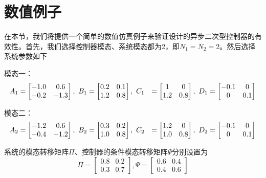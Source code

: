 \section{数值例子}
	在本节，我们将提供一个简单的数值仿真例子来验证设计的异步二次型控制器的有效性。首先，我们选择控制器模态、系统模态都为2，即$N_1=N_2=2$。然后选择系统参数如下
	
	模态一：
	\begin{equation} \notag
	\begin{aligned}
	A_{1} &= \begin{bmatrix}
	-1.0&0.6\\
	-0.2&-1.3
	\end{bmatrix}, \ 
	B_{1} = \begin{bmatrix}
	0.2&0.1\\ 1.2&0.8
	\end{bmatrix} ,\
		C_{1} &= \begin{bmatrix}
	1&0\\1.2&0.8
	\end{bmatrix},\
	D_{1} = \begin{bmatrix}
	-0.1&0\\0&0.1
	\end{bmatrix}
	\end{aligned}  
	\end{equation}
	
	模态二：
	\begin{equation} \notag
	\begin{aligned}
	A_{2} &= \begin{bmatrix}
	-1.2&0.6\\
	-0.4&-1.2
	\end{bmatrix}, \ 
	B_{2} = \begin{bmatrix}
	0.3&0.2\\ 1.0&0.8
	\end{bmatrix} ,\
	C_{2} &= \begin{bmatrix}
	1.2&0\\1.0&0.8
	\end{bmatrix},\
	D_{2} = \begin{bmatrix}
	-0.1&0\\0&0.1
	\end{bmatrix}
	\end{aligned}  
	\end{equation}
	
	系统的模态转移矩阵$\varPi$、控制器的条件模态转移矩阵$\varPsi$分别设置为
	\begin{equation}
		\varPi = \begin{bmatrix}
		0.8& 0.2\\ 0.3& 0.7
		\end{bmatrix},    %
		\varPsi = \begin{bmatrix}
			0.6& 0.4\\0.4 &0.6
		\end{bmatrix}
	\end{equation}
	
